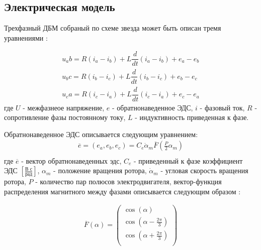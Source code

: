 \subsection{Электрическая модель} \label{sec:ch3/sec9/sub4}
Трехфазный ДБМ собраный по схеме звезда может быть описан тремя уравнениями \cite[]{BLDC_Stefan}:

\begin{equation}
\label{eq:p3:9.1}
\begin{alignedat}{2}
u_ab = R (i_a - i_b) + L \dfrac{d}{dt} (i_a - i_b) + e_a - e_b \\
u_bc = R (i_b - i_c) + L \dfrac{d}{dt} (i_b - i_c) + e_b - e_c \\
u_ca = R (i_c - i_a) + L \dfrac{d}{dt} (i_c - i_a) + e_c - e_a
\end{alignedat}
\end{equation}
где 
$U$ - межфазнеое напряжение, 
$e$ - обратнонаведенное ЭДС, 
$i$ - фазовый ток, 
$R$ - сопротивление фазы постоянному току, 
$L$ - индуктивность приведенная к фазе.

Обратнонаведенное ЭДС описывается следующим уравнением:
\begin{equation}
\label{eq:p3:9.2}
\begin{alignedat}{2}
\overline{e} = (e_a, e_b, e_c) = C_e \dot{\alpha}_m \overline{F}(\frac{\textit{P}}{2}\alpha_m)\\
\end{alignedat}
\end{equation}
где 
$\overline{e}$ - вектор обратнонаведенных эдс, 
$C_e$ - приведенный к фазе коэффициент ЭДС $[\frac{\textit{В с}}{\textit{рад}} ]$,
$\alpha_m$ - положение вращения ротора, 
$\dot{\alpha}_m$ - угловая скорость вращения ротора, 
$\textit{P}$ - количество пар полюсов электродвигателя, 
вектор-функция распределения магнитного между фазами описывается следующим образом \cite[]{MATLAB1}:

\begin{equation}
\label{eq:p3:9.3}
\begin{alignedat}{2}
\overline{F}(\alpha) = \left( \begin{matrix}
\cos (\alpha) \\
\cos (\alpha - \frac{2 \pi}{3}) \\
\cos (\alpha + \frac{2 \pi}{3}) \\
\end{matrix}
\right) \\
\end{alignedat}
\end{equation}

